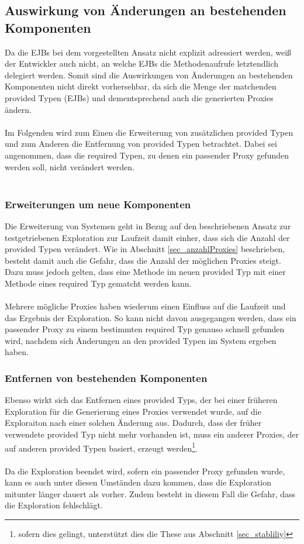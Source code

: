 \subsection{Auswirkung von Änderungen an bestehenden Komponenten}
Da die EJBs bei dem vorgestellten Ansatz nicht explizit adressiert werden, weiß der Entwickler auch nicht, an welche EJBs die Methodenaufrufe letztendlich delegiert werden. Somit sind die Auswirkungen von Änderungen an bestehenden Komponenten nicht direkt vorhersehbar, da sich die Menge der matchenden provided Typen (EJBs) und dementsprechend auch die generierten Proxies ändern.
\\\\
Im Folgenden wird zum Einen die Erweiterung von zusätzlichen provided Typen und zum Anderen die Entfernung von provided Typen betrachtet. Dabei sei angenommen, dass die required Typen, zu denen ein passender Proxy gefunden werden soll, nicht verändert werden.
\\\\
\subsubsection{Erweiterungen um neue Komponenten}
Die Erweiterung von Systemen geht in Bezug auf den beschriebenen Ansatz zur testgetriebenen Exploration zur Laufzeit damit einher, dass sich die Anzahl der provided Typen verändert. Wie in Abschnitt \ref{sec_anzahlProxies} beschrieben, besteht damit auch die Gefahr, dass die Anzahl der möglichen Proxies steigt. Dazu muss jedoch gelten, dass eine Methode im neuen provided Typ mit einer Methode eines required Typ gematcht werden kann.
\\\\
Mehrere mögliche Proxies haben wiederum einen Einfluss auf die Laufzeit und das Ergebnis der Exploration. So kann nicht davon ausgegangen werden, dass ein passender Proxy zu einem bestimmten required Typ genauso schnell gefunden wird, nachdem sich Änderungen an den provided Typen im System ergeben haben.
\subsubsection{Entfernen von bestehenden Komponenten}
Ebenso wirkt sich das Entfernen eines provided Typs, der bei einer früheren Exploration für die Generierung eines Proxies verwendet wurde, auf die Exploraiton nach einer solchen Änderung aus. Dadurch, dass der früher verwendete provided Typ nicht mehr vorhanden ist, muss ein anderer Proxies, der auf anderen provided Typen basiert, erzeugt werden\footnote{sofern dies gelingt, unterstützt dies die These aus Abschnitt \ref{sec_stabliliy}}.
\\\\
Da die Exploration beendet wird, sofern ein passender Proxy gefunden wurde, kann es auch unter diesen Umständen dazu kommen, dass die Exploration mitunter länger dauert als vorher. Zudem besteht in diesem Fall die Gefahr, dass die Exploration fehlschlägt.

